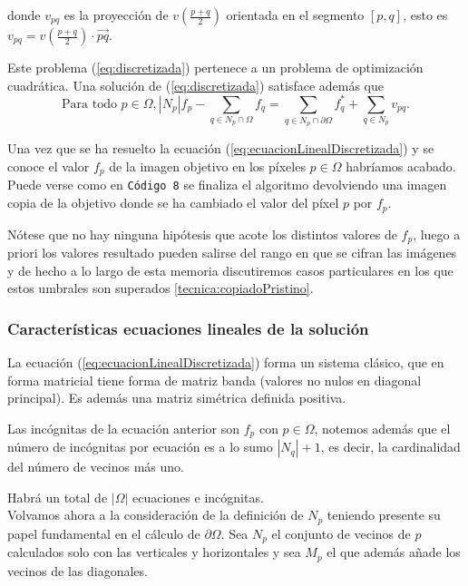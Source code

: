 \documentclass[11pt,twoside,titlepage,a4paper]{article}
\numberwithin{equation}{section} %
\theoremstyle{usual}
\begin{document}
donde $v_{pq}$ es la proyección de $v(\frac{p+q}{2})$ orientada en el segmento 
$\left[ p,q \right]$, 
esto es $v_{pq} = v(\frac{p+q}{2})\cdot  \overrightarrow{pq}$. 

Este problema (\ref{eq:discretizada}) pertenece a un problema de optimización cuadrática. 
Una solución de (\ref{eq:discretizada}) satisface además que 
\begin{equation}\label{eq:ecuacionLinealDiscretizada}
    \text{Para todo } p \in \Omega, |N_p| f_p - \sum_{q \in N_p \cap \Omega} f_q = \sum_{q \in N_p \cap \partial \Omega} f^*_q + \sum_{q \in N_p } v_{pq}.
\end{equation}

Una vez que se ha resuelto la ecuación (\ref{eq:ecuacionLinealDiscretizada}) y se conoce el valor $f_p$ de la imagen objetivo en los píxeles $p \in \Omega$  habríamos acabado. 
Puede verse como en \texttt{Código 8} se finaliza el algoritmo devolviendo una imagen copia de la objetivo donde se ha cambiado el valor del píxel $p$ por $f_p$. 

Nótese que no hay ninguna hipótesis que acote los distintos valores de $f_p$, luego a priori los valores resultado pueden salirse del rango en que se cifran las imágenes y de hecho a lo largo de esta memoria discutiremos casos particulares en los que estos umbrales son superados \ref{tecnica:copiadoPristino}. 


\subsubsection{Características ecuaciones lineales de la solución} \label{sussubLineales}

La ecuación  (\ref{eq:ecuacionLinealDiscretizada}) forma un sistema clásico, que en forma matricial tiene forma de matriz banda (valores no nulos en diagonal principal). 
Es además una matriz simétrica definida positiva. 

Las incógnitas de la ecuación anterior son $f_p$ con $p \in \Omega$, notemos además que el número de incógnitas por ecuación es a lo sumo $|N_q| + 1$, es decir, la cardinalidad del número de vecinos más uno. 

Habrá un total de $|\Omega|$ ecuaciones e incógnitas. 
\\
Volvamos ahora a la consideración de la definición de  $N_p$ teniendo presente su papel fundamental en el cálculo de $\partial \Omega$. 
Sea $N_p$ el conjunto de vecinos  de $p$ calculados solo con las verticales y horizontales y sea $M_p$ el que además añade los vecinos de las diagonales. 
\end{document}
